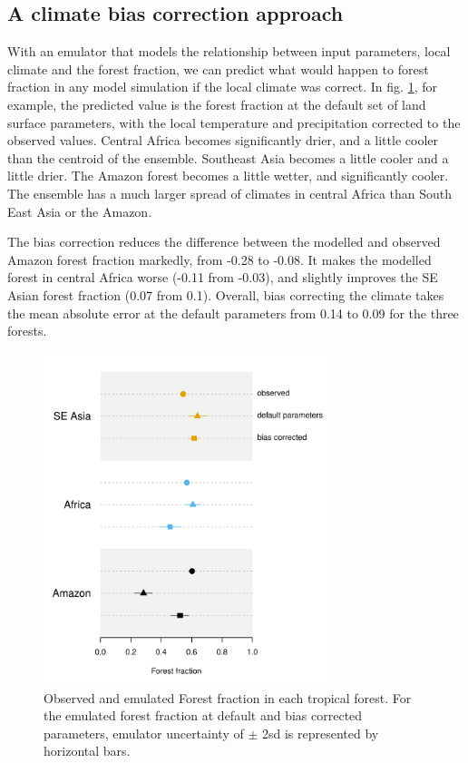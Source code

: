 \documentclass[gmd, manuscript]{copernicus}
\begin{document}
\subsection{A climate bias correction approach}\label{ssec:bc_approach}
With an emulator that models the relationship between input parameters, local climate and the forest fraction, we can predict what would happen to forest fraction in any model simulation if the local climate was correct. In fig. \ref{fig:dotchart_fractions}, for example, the predicted value is the forest fraction at the default set of land surface parameters, with the local temperature and precipitation corrected to the observed values. Central Africa becomes significantly drier, and a little cooler than the centroid of the ensemble. Southeast Asia becomes a little cooler and a little drier. The Amazon forest becomes a little wetter, and significantly cooler. The ensemble has a much larger spread of climates in central Africa than South East Asia or the Amazon.

The bias correction reduces the difference between the modelled and observed Amazon forest fraction markedly, from -0.28 to -0.08. It makes the modelled forest in central Africa worse (-0.11 from -0.03), and slightly improves the SE Asian forest fraction (0.07 from 0.1). Overall, bias correcting the climate takes the mean absolute error at the default parameters from 0.14 to 0.09 for the three forests.


\begin{figure}[t]
\includegraphics[width=8.3cm]{../graphics/dotchart_fractions.pdf}
\caption{Observed and emulated Forest fraction in each tropical forest. For the emulated forest fraction at default and bias corrected parameters, emulator uncertainty of $\pm$ 2sd is represented by horizontal bars.
}
\label{fig:dotchart_fractions}
\end{figure}
\end{document}
